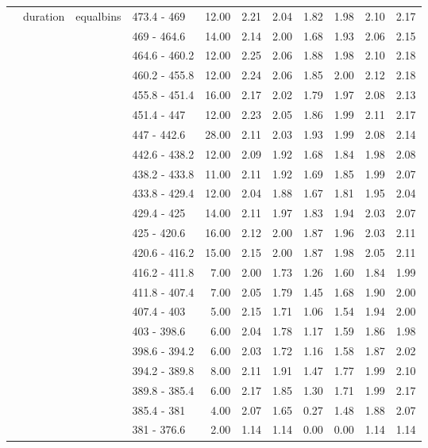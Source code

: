 \begin{longtable}{llllrrrrrrr}
   & duration & equalbins & 473.4 - 469 & 12.00 & 2.21 & 2.04 & 1.82 & 1.98 & 2.10 & 2.17 \\ 
   &  &  & 469 - 464.6 & 14.00 & 2.14 & 2.00 & 1.68 & 1.93 & 2.06 & 2.15 \\ 
   &  &  & 464.6 - 460.2 & 12.00 & 2.25 & 2.06 & 1.88 & 1.98 & 2.10 & 2.18 \\ 
   &  &  & 460.2 - 455.8 & 12.00 & 2.24 & 2.06 & 1.85 & 2.00 & 2.12 & 2.18 \\ 
   &  &  & 455.8 - 451.4 & 16.00 & 2.17 & 2.02 & 1.79 & 1.97 & 2.08 & 2.13 \\ 
   &  &  & 451.4 - 447 & 12.00 & 2.23 & 2.05 & 1.86 & 1.99 & 2.11 & 2.17 \\ 
   &  &  & 447 - 442.6 & 28.00 & 2.11 & 2.03 & 1.93 & 1.99 & 2.08 & 2.14 \\ 
   &  &  & 442.6 - 438.2 & 12.00 & 2.09 & 1.92 & 1.68 & 1.84 & 1.98 & 2.08 \\ 
   &  &  & 438.2 - 433.8 & 11.00 & 2.11 & 1.92 & 1.69 & 1.85 & 1.99 & 2.07 \\ 
   &  &  & 433.8 - 429.4 & 12.00 & 2.04 & 1.88 & 1.67 & 1.81 & 1.95 & 2.04 \\ 
   &  &  & 429.4 - 425 & 14.00 & 2.11 & 1.97 & 1.83 & 1.94 & 2.03 & 2.07 \\ 
   &  &  & 425 - 420.6 & 16.00 & 2.12 & 2.00 & 1.87 & 1.96 & 2.03 & 2.11 \\ 
   &  &  & 420.6 - 416.2 & 15.00 & 2.15 & 2.00 & 1.87 & 1.98 & 2.05 & 2.11 \\ 
   &  &  & 416.2 - 411.8 & 7.00 & 2.00 & 1.73 & 1.26 & 1.60 & 1.84 & 1.99 \\ 
   &  &  & 411.8 - 407.4 & 7.00 & 2.05 & 1.79 & 1.45 & 1.68 & 1.90 & 2.00 \\ 
   &  &  & 407.4 - 403 & 5.00 & 2.15 & 1.71 & 1.06 & 1.54 & 1.94 & 2.00 \\ 
   &  &  & 403 - 398.6 & 6.00 & 2.04 & 1.78 & 1.17 & 1.59 & 1.86 & 1.98 \\ 
   &  &  & 398.6 - 394.2 & 6.00 & 2.03 & 1.72 & 1.16 & 1.58 & 1.87 & 2.02 \\ 
   &  &  & 394.2 - 389.8 & 8.00 & 2.11 & 1.91 & 1.47 & 1.77 & 1.99 & 2.10 \\ 
   &  &  & 389.8 - 385.4 & 6.00 & 2.17 & 1.85 & 1.30 & 1.71 & 1.99 & 2.17 \\ 
   &  &  & 385.4 - 381 & 4.00 & 2.07 & 1.65 & 0.27 & 1.48 & 1.88 & 2.07 \\ 
   &  &  & 381 - 376.6 & 2.00 & 1.14 & 1.14 & 0.00 & 0.00 & 1.14 & 1.14 \\ 

\end{longtable}
